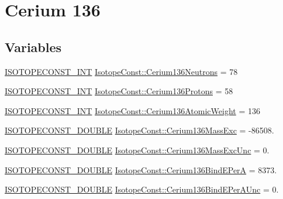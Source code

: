 \hypertarget{group___isotope_const-_cerium-_ce136}{}\section{Cerium 136}
\label{group___isotope_const-_cerium-_ce136}
\subsection*{Variables}
\begin{DoxyCompactItemize}
\item 
\mbox{\hyperlink{group___isotope_const-_macros_ga5f18360b3e99483a35c32d789e62621c}{I\+S\+O\+T\+O\+P\+E\+C\+O\+N\+S\+T\+\_\+\+I\+NT}} \mbox{\hyperlink{group___isotope_const-_cerium-_ce136_gabea84736787af41c9f4c92542b025fa7}{Isotope\+Const\+::\+Cerium136\+Neutrons}} = 78
\item 
\mbox{\hyperlink{group___isotope_const-_macros_ga5f18360b3e99483a35c32d789e62621c}{I\+S\+O\+T\+O\+P\+E\+C\+O\+N\+S\+T\+\_\+\+I\+NT}} \mbox{\hyperlink{group___isotope_const-_cerium-_ce136_gafec670d77c2c3573c7fdbe90057f68e1}{Isotope\+Const\+::\+Cerium136\+Protons}} = 58
\item 
\mbox{\hyperlink{group___isotope_const-_macros_ga5f18360b3e99483a35c32d789e62621c}{I\+S\+O\+T\+O\+P\+E\+C\+O\+N\+S\+T\+\_\+\+I\+NT}} \mbox{\hyperlink{group___isotope_const-_cerium-_ce136_gad8ea6fbbd6db028228cae4b108fbf20b}{Isotope\+Const\+::\+Cerium136\+Atomic\+Weight}} = 136
\item 
\mbox{\hyperlink{group___isotope_const-_macros_ga8f45a7272ce02c0b4c65c44636ed719a}{I\+S\+O\+T\+O\+P\+E\+C\+O\+N\+S\+T\+\_\+\+D\+O\+U\+B\+LE}} \mbox{\hyperlink{group___isotope_const-_cerium-_ce136_ga48026dc3c5a30626f499dc67d2099ab9}{Isotope\+Const\+::\+Cerium136\+Mass\+Exc}} = -\/86508.
\item 
\mbox{\hyperlink{group___isotope_const-_macros_ga8f45a7272ce02c0b4c65c44636ed719a}{I\+S\+O\+T\+O\+P\+E\+C\+O\+N\+S\+T\+\_\+\+D\+O\+U\+B\+LE}} \mbox{\hyperlink{group___isotope_const-_cerium-_ce136_ga9c636b2458f0c0c230827b480b84a7e3}{Isotope\+Const\+::\+Cerium136\+Mass\+Exc\+Unc}} = 0.
\item 
\mbox{\hyperlink{group___isotope_const-_macros_ga8f45a7272ce02c0b4c65c44636ed719a}{I\+S\+O\+T\+O\+P\+E\+C\+O\+N\+S\+T\+\_\+\+D\+O\+U\+B\+LE}} \mbox{\hyperlink{group___isotope_const-_cerium-_ce136_gac9d39fd4b167ab2872a7174ebf561f20}{Isotope\+Const\+::\+Cerium136\+Bind\+E\+PerA}} = 8373.
\item 
\mbox{\hyperlink{group___isotope_const-_macros_ga8f45a7272ce02c0b4c65c44636ed719a}{I\+S\+O\+T\+O\+P\+E\+C\+O\+N\+S\+T\+\_\+\+D\+O\+U\+B\+LE}} \mbox{\hyperlink{group___isotope_const-_cerium-_ce136_ga84151a410aa0e08cd087c067e0949ce8}{Isotope\+Const\+::\+Cerium136\+Bind\+E\+Per\+A\+Unc}} = 0.

\end{DoxyCompactItemize}
